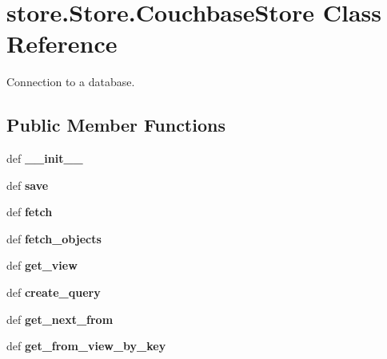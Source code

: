 \hypertarget{classstore_1_1_store_1_1_couchbase_store}{\section{store.\-Store.\-Couchbase\-Store Class Reference}
\label{classstore_1_1_store_1_1_couchbase_store}
}


Connection to a database.  


\subsection*{Public Member Functions}
\begin{DoxyCompactItemize}
\item 
\hypertarget{classstore_1_1_store_1_1_couchbase_store_ab756e679cc271b5276f7f7bd39907362}{def {\bfseries \-\_\-\-\_\-init\-\_\-\-\_\-}}\label{classstore_1_1_store_1_1_couchbase_store_ab756e679cc271b5276f7f7bd39907362}

\item 
\hypertarget{classstore_1_1_store_1_1_couchbase_store_a8aea2413ee17d4f88d5d11d497c334cc}{def {\bfseries save}}\label{classstore_1_1_store_1_1_couchbase_store_a8aea2413ee17d4f88d5d11d497c334cc}

\item 
\hypertarget{classstore_1_1_store_1_1_couchbase_store_a50c6472b5c3972dff22e4662590c3ca7}{def {\bfseries fetch}}\label{classstore_1_1_store_1_1_couchbase_store_a50c6472b5c3972dff22e4662590c3ca7}

\item 
\hypertarget{classstore_1_1_store_1_1_couchbase_store_abaa51ed005860a092a94edc15c9c13ac}{def {\bfseries fetch\-\_\-objects}}\label{classstore_1_1_store_1_1_couchbase_store_abaa51ed005860a092a94edc15c9c13ac}

\item 
\hypertarget{classstore_1_1_store_1_1_couchbase_store_ae46f604d7d71ddac50f7ba27b61308a4}{def {\bfseries get\-\_\-view}}\label{classstore_1_1_store_1_1_couchbase_store_ae46f604d7d71ddac50f7ba27b61308a4}

\item 
\hypertarget{classstore_1_1_store_1_1_couchbase_store_aa23b9d3e66a1361597221b86e3ca3dad}{def {\bfseries create\-\_\-query}}\label{classstore_1_1_store_1_1_couchbase_store_aa23b9d3e66a1361597221b86e3ca3dad}

\item 
\hypertarget{classstore_1_1_store_1_1_couchbase_store_a9d6730e1dbf17f80dc120b3f3bc239c6}{def {\bfseries get\-\_\-next\-\_\-from}}\label{classstore_1_1_store_1_1_couchbase_store_a9d6730e1dbf17f80dc120b3f3bc239c6}

\item 
\hypertarget{classstore_1_1_store_1_1_couchbase_store_a7841d51ea60b77bcae3b24f5448a6a65}{def {\bfseries get\-\_\-from\-\_\-view\-\_\-by\-\_\-key}}\label{classstore_1_1_store_1_1_couchbase_store_a7841d51ea60b77bcae3b24f5448a6a65}

\end{DoxyCompactItemize}
